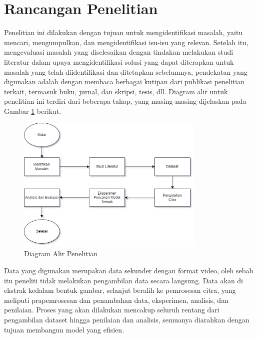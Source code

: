 \vspace{1cm}

\section{Rancangan Penelitian}

   Penelitian ini dilakukan dengan tujuan untuk mengidentifikasi  masalah, yaitu mencari, mengumpulkan, dan mengidentifikasi isu-isu yang relevan. Setelah itu, mengevaluasi masalah yang diselesaikan dengan tindakan melakukan studi literatur dalam upaya mengidentifikasi solusi yang dapat diterapkan untuk masalah yang telah diidentifikasi dan ditetapkan sebelumnya, pendekatan yang digunakan adalah dengan membaca berbagai kutipan dari publikasi penelitian terkait, termasuk buku, jurnal, dan skripsi, tesis, dll. Diagram alir untuk penelitian ini terdiri dari beberapa tahap, yang masing-masing dijelaskan pada Gambar \ref{Diagram Alir Penelitian} berikut. 



    \begin{figure}[H]
      \centering
      \includegraphics[width=0.8\textwidth]{figures/bab3/Diagram alir penelitian.png}
      \caption{Diagram Alir Penelitian}
      \label{Diagram Alir Penelitian}
      \medskip %
      \begin{minipage}{0.8\textwidth}
        \centering
      \end{minipage}
    \end{figure}


    Data yang digunakan merupakan data sekunder dengan format video, oleh sebab itu peneliti tidak melakukan pengambilan data secara langsung. Data akan di ekstrak kedalam bentuk gambar, selanjut beralih ke pemrosesan citra, yang meliputi prapemrosesan dan penambahan data, eksperimen, analisis, dan penilaian. Proses yang akan dilakukan mencakup seluruh rentang dari  pengambilan dataset hingga penilaian dan analisis, semuanya diarahkan dengan tujuan membangun model yang efisien. 
    
